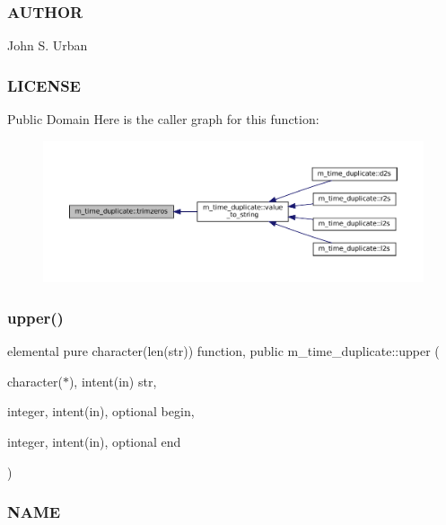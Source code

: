 \subsubsection*{A\+U\+T\+H\+OR}

John S. Urban \subsubsection*{L\+I\+C\+E\+N\+SE}

Public Domain Here is the caller graph for this function\+:\nopagebreak
\begin{figure}[H]
\begin{center}
\leavevmode
\includegraphics[width=350pt]{namespacem__time__duplicate_ae5ec641c9bdaa5d9377e47310e2165be_icgraph}
\end{center}
\end{figure}
\mbox{\label{namespacem__time__duplicate_aabdd1a3e01b26e896bd06aee488de7c6}} 
\subsubsection{\texorpdfstring{upper()}{upper()}}
{\footnotesize\ttfamily elemental pure character(len(str)) function, public m\+\_\+time\+\_\+duplicate\+::upper (\begin{DoxyParamCaption}\item[{character($\ast$), intent(in)}]{str,  }\item[{integer, intent(in), optional}]{begin,  }\item[{integer, intent(in), optional}]{end }\end{DoxyParamCaption})}



\subsubsection*{N\+A\+ME}

